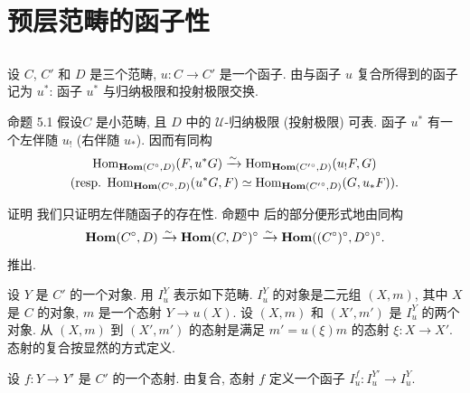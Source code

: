 \section{预层范畴的函子性}

\setcounter{subsection}{-1}
\subsection{}
设 $C$, $C'$ 和 $D$ 是三个范畴, $u:C\rightarrow C'$ 是一个函子.
由与函子 $u$ 复合所得到的函子记为 $u^\ast$:
函子 $u^\ast$ 与归纳极限和投射极限交换.

\begin{enonce*}{命题 5.1}
假设\pageoriginale $C$ 是小范畴, 且 $D$ 中的 $𝒰$-归纳极限
(\resp 投射极限) 可表. 函子 $u^\ast$ 有一个左伴随 $u_{!}$
(\resp 右伴随 $u_\ast$). 因而有同构
\begin{gather*}
\operatorname{Hom}_{\operatorname{\mathbf{Hom}}(C^\circ,D)}(F,u^\ast G)\xrightarrow{\sim}
\operatorname{Hom}_{\operatorname{\mathbf{Hom}}({C'}^\circ,D)}(u_{!}F,G)\\
(\mbox{resp.\kern.3em} \operatorname{Hom}_{\operatorname{\mathbf{Hom}}(C^\circ,D)}(u^\ast G,F)\simeq
\operatorname{Hom}_{\operatorname{\mathbf{Hom}}({C'}^\circ,D)}(G,u_\ast F){}).
\end{gather*}
\end{enonce*}

\begin{enonce*}[remark]{证明}
我们只证明左伴随函子的存在性. 命题中 \resp 后的部分便形式地由同构
$$
\operatorname{\mathbf{Hom}}(C^\circ,
D)\xrightarrow{\sim}\operatorname{\mathbf{Hom}}(C,D^\circ)^\circ\xrightarrow{\sim}\operatorname{\mathbf{Hom}}((C^\circ)^\circ,D^\circ)^\circ{}.
$$
推出.
\end{enonce*}

设 $Y$ 是 $C'$ 的一个对象. 用 $I^Y_u$ 表示如下范畴.
$I^Y_u$ 的对象是二元组 $(X,m)$, 其中 $X$ 是 $C$ 的对象,
$m$ 是一个态射 $Y\rightarrow u(X)$. 设 $(X,m)$ 和 $(X',m')$
是 $I^Y_u$ 的两个对象. 从 $(X,m)$ 到 $(X',m')$ 的态射是满足
$m'=u(\xi)m$ 的态射 $\xi:X\rightarrow X'$. 态射的复合按显然的方式定义.

设 $f:Y\rightarrow Y'$ 是 $C'$ 的一个态射. 由复合, 态射 $f$
定义一个函子 $I^f_u:I^{Y'}_u\rightarrow I^Y_u$.

